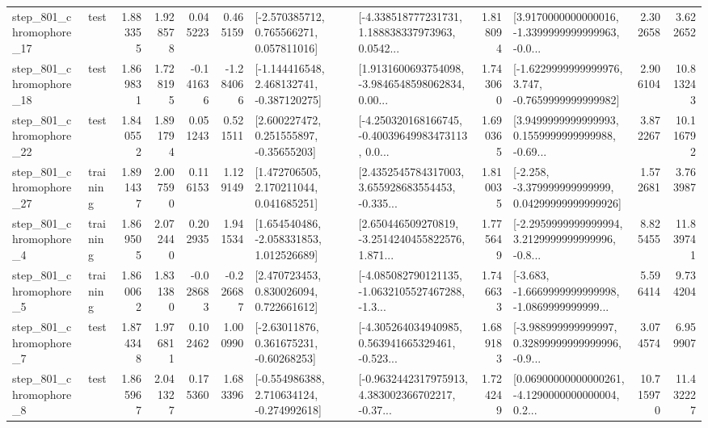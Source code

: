 \begin{tabular}{llrrrrllrlrr}
  step\_801\_chromophore\_17 &      test &      1.883355 &    1.928578 &      0.045223 &  0.465159 &    [-2.570385712, 0.765566271, 0.057811016] &  [-4.338518777231731, 1.188838337973963, 0.0542... &       1.818094 &  [3.9170000000000016, -1.3399999999999963, -0.0... &            2.302658 &          3.622652 \\
  step\_801\_chromophore\_18 &      test &      1.869831 &    1.728195 &     -0.141636 & -1.284066 &   [-1.144416548, 2.468132741, -0.387120275] &  [1.9131600693754098, -3.9846548598062834, 0.00... &       1.743060 &  [-1.6229999999999976, 3.747, -0.7659999999999982] &            2.906104 &         10.813243 \\
  step\_801\_chromophore\_22 &      test &      1.840552 &    1.891794 &      0.051243 &  0.521511 &     [2.600227472, 0.251555897, -0.35655203] &  [-4.250320168166745, -0.40039649983473113, 0.0... &       1.690365 &  [3.9499999999999993, 0.1559999999999988, -0.69... &            3.872267 &         10.116792 \\
  step\_801\_chromophore\_27 &  training &      1.891437 &    2.007590 &      0.116153 &  1.129149 &     [1.472706505, 2.170211044, 0.041685251] &  [2.4352545784317003, 3.655928683554453, -0.335... &       1.810035 &  [-2.258, -3.379999999999999, 0.04299999999999926] &            1.572681 &          3.763987 \\
   step\_801\_chromophore\_4 &  training &      1.869505 &    2.072440 &      0.202935 &  1.941534 &    [1.654540486, -2.058331853, 1.012526689] &  [2.650446509270819, -3.2514240455822576, 1.871... &       1.775649 &  [-2.2959999999999994, 3.2129999999999996, -0.8... &            8.825455 &         11.839741 \\
   step\_801\_chromophore\_5 &  training &      1.860062 &    1.831380 &     -0.028683 & -0.226687 &     [2.470723453, 0.830026094, 0.722661612] &  [-4.085082790121135, -1.0632105527467288, -1.3... &       1.746633 &  [-3.683, -1.6669999999999998, -1.0869999999999... &            5.596414 &          9.734204 \\
   step\_801\_chromophore\_7 &      test &      1.874348 &    1.976811 &      0.102462 &  1.000990 &     [-2.63011876, 0.361675231, -0.60268253] &  [-4.305264034940985, 0.563941665329461, -0.523... &       1.689183 &  [-3.988999999999997, 0.32899999999999996, -0.9... &            3.074574 &          6.959907 \\
   step\_801\_chromophore\_8 &      test &      1.865967 &    2.041327 &      0.175360 &  1.683396 &   [-0.554986388, 2.710634124, -0.274992618] &  [-0.9632442317975913, 4.383002366702217, -0.37... &       1.724249 &  [0.06900000000000261, -4.1290000000000004, 0.2... &           10.715970 &         11.432227 \\

\end{tabular}
